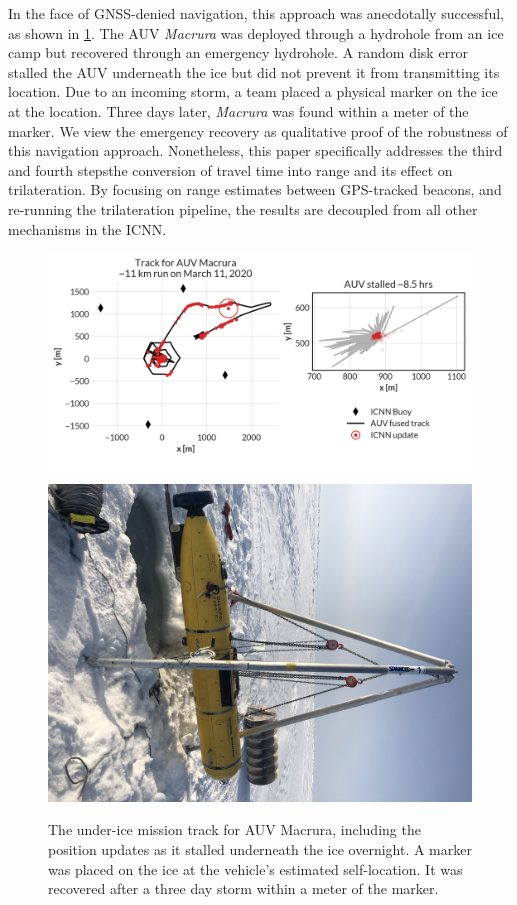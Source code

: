 In the face of GNSS-denied navigation, this approach was anecdotally successful, as shown in \ref{fig:vehicleRecovery}.
The AUV \emph{Macrura} was deployed through a hydrohole from an ice camp but recovered through an emergency hydrohole.
A random disk error stalled the AUV underneath the ice but did not prevent it from transmitting its location.
Due to an incoming storm, a team placed a physical marker on the ice at the location.
Three days later, \emph{Macrura} was found within a meter of the marker.
We view the emergency recovery as qualitative proof of the robustness of this navigation approach.
Nonetheless, this paper specifically addresses the third and fourth steps\textemdash the conversion of travel time into range and its effect on trilateration.
By focusing on range estimates between GPS-tracked beacons, and re-running the trilateration pipeline, the results are decoupled from all other mechanisms in the ICNN.

\begin{figure}[h!]
	\centering
	\includegraphics[width=0.7\columnwidth]{figs/auv-track-update.png} \hfill
	\includegraphics[width=0.28\columnwidth]{figs/Fig1.jpg}
	\caption{The under-ice mission track for AUV Macrura, including the position updates as it stalled underneath the ice overnight. A marker was placed on the ice at the vehicle's estimated self-location. It was recovered after a three day storm within a meter of the marker.}
	\label{fig:vehicleRecovery}
\end{figure}


